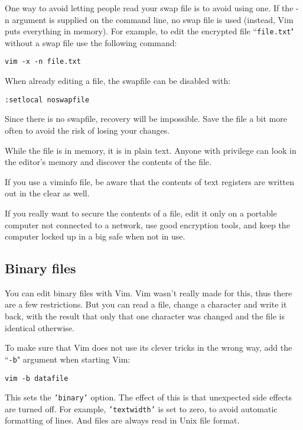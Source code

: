 One way to avoid letting people read your swap file is to avoid using one.
If the -n argument is supplied on the command line, no swap file is used (instead, Vim puts everything in memory).
For example, to edit the encrypted file ``\texttt{file.txt}" without a swap file use the following command:

\begin{Verbatim}[samepage=true]
 vim -x -n file.txt
\end{Verbatim}

When already editing a file, the swapfile can be disabled with:

\begin{Verbatim}[samepage=true]
 :setlocal noswapfile
\end{Verbatim}

Since there is no swapfile, recovery will be impossible.
Save the file a bit more often to avoid the risk of losing your changes.

While the file is in memory, it is in plain text.
Anyone with privilege can look in the editor's memory and discover the contents of the file.

If you use a viminfo file, be aware that the contents of text registers are written out in the clear as well.

If you really want to secure the contents of a file, edit it only on a portable computer not connected to a network, use good encryption tools, and keep the computer locked up in a big safe when not in use.
\subsection{Binary files}
You can edit binary files with Vim.
Vim wasn't really made for this, thus there are a few restrictions.
But you can read a file, change a character and write it back, with the result that only that one character was changed and the file is identical otherwise.

To make sure that Vim does not use its clever tricks in the wrong way, add the ``\texttt{-b}" argument when starting Vim:

\begin{Verbatim}[samepage=true]
 vim -b datafile
\end{Verbatim}

This sets the \texttt{'binary'} option.
The effect of this is that unexpected side effects are turned off.
For example, \texttt{'textwidth'} is set to zero, to avoid automatic formatting of lines.
And files are always read in Unix file format.

